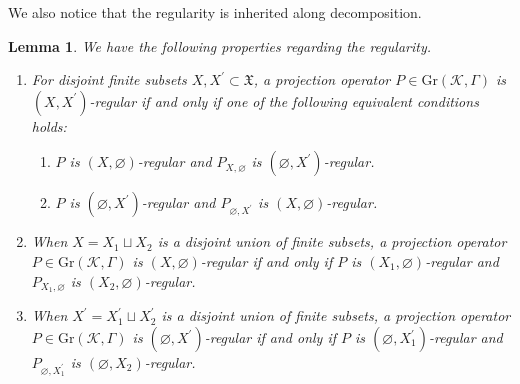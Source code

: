 \documentclass[11pt]{article}
\numberwithin{equation}{section}
\numberwithin{equation}{section}
\newtheorem{Lemma}[Theorem]{Lemma}
\newcommand{\pr}[1]{#1^{\prime}}
\newcommand{\mfrak}[1]{\mathfrak{#1}}
\newcommand{\mcal}[1]{\mathcal{#1}}
\newcommand{\mrm}[1]{\mathrm{#1}}
\begin{document}
We also notice that the regularity is inherited along decomposition.
\begin{Lemma}\label{lem:regularity_decomp} We have the following properties regarding the regularity.
\begin{enumerate}\itemsep=0pt
\item[$1.$] 	For disjoint finite subsets $X,\pr{X}\subset\mfrak{X}$, a projection operator $P\in\mrm{Gr}(\mcal{K},\Gamma)$ is $(X,\pr{X})$-regular if and only if one of the following equivalent conditions holds:
		\begin{enumerate}\itemsep=0pt
		\item[$(a)$] 	$P$ is $(X,\varnothing)$-regular and $P_{X,\varnothing}$ is $(\varnothing,\pr{X})$-regular.
		\item[$(b)$] 	$P$ is $(\varnothing,\pr{X})$-regular and $P_{\varnothing,\pr{X}}$ is $(X,\varnothing)$-regular.
		\end{enumerate}
\item[$2.$] 	When $X=X_{1}\sqcup X_{2}$ is a disjoint union of finite subsets, a projection operator $P\in\mrm{Gr}(\mcal{K},\Gamma)$ is $(X,\varnothing)$-regular if and only if $P$ is $(X_{1},\varnothing)$-regular and $P_{X_{1},\varnothing}$ is $(X_{2},\varnothing)$-regular.
\item[$3.$] 	When $\pr{X}=\pr{X}_{1}\sqcup \pr{X}_{2}$ is a disjoint union of finite subsets, a projection operator $P\in\mrm{Gr}(\mcal{K},\Gamma)$ is $(\varnothing,\pr{X})$-regular if and only if $P$ is $(\varnothing,\pr{X}_{1})$-regular and $P_{\varnothing,\pr{X}_{1}}$ is $(\varnothing,X_{2})$-regular.
\end{enumerate}
\end{Lemma}
\end{document}
